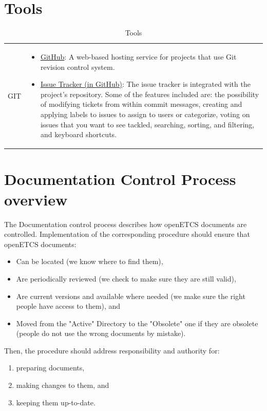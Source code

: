 \documentclass{template/openetcs_article}
\begin{document}
\section{Tools}
\begin{table}[H]
\begin{tabular}{|m{3cm}|m{11cm}|}
\hline
\rowcolor{myblue}
\multicolumn{2}{|c|}{Tools} \\\hline
GIT &
\begin{itemize}
\item \underline{GitHub}: A web-based hosting service for projects that use Git revision control system.
\item \underline{Issue Tracker (in GitHub)}: The issue tracker is integrated with the project's repository. Some of the features included are: the possibility of modifying tickets from within commit messages,
creating and applying labels to issues to assign to users or categorize, voting on issues that you want to see tackled, searching, sorting, and filtering, and keyboard shortcuts.
\end{itemize}
\\\hline
\end{tabular}
\caption{Tools}
\end{table}

\section{Documentation Control Process overview}

The Documentation control process describes how openETCS documents are controlled. Implementation of the corresponding procedure should ensure that openETCS documents:

\begin{itemize}
\item Can be located (we know where to find them),
\item Are periodically reviewed (we check to make sure they are still valid),
\item Are current versions and available where needed (we make sure the right people have access to them), and
\item Moved from the "Active" Directory to the "Obsolete" one if they are obsolete (people do not use the wrong documents by mistake).
\end{itemize}

Then, the procedure should address responsibility and authority for:
\begin{enumerate}
\item preparing documents,
\item making changes to them, and
\item keeping them up-to-date.
\end{enumerate}
\end{document}
